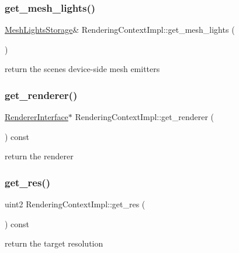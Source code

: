 \subsubsection{\texorpdfstring{get\+\_\+mesh\+\_\+lights()}{get\_mesh\_lights()}}
{\footnotesize\ttfamily \hyperlink{struct_mesh_lights_storage}{Mesh\+Lights\+Storage}\& Rendering\+Context\+Impl\+::get\+\_\+mesh\+\_\+lights (\begin{DoxyParamCaption}{ }\end{DoxyParamCaption})\hspace{0.3cm}{\ttfamily [inline]}}

return the scene\textquotesingle{}s device-\/side mesh emitters \mbox{\label{struct_rendering_context_impl_ab124c479feb26e431288df7fc20804a2}} 
\subsubsection{\texorpdfstring{get\+\_\+renderer()}{get\_renderer()}}
{\footnotesize\ttfamily \hyperlink{struct_renderer_interface}{Renderer\+Interface}$\ast$ Rendering\+Context\+Impl\+::get\+\_\+renderer (\begin{DoxyParamCaption}{ }\end{DoxyParamCaption}) const\hspace{0.3cm}{\ttfamily [inline]}}

return the renderer \mbox{\label{struct_rendering_context_impl_a691288ce177e1411abfcc6589d47e788}} 
\subsubsection{\texorpdfstring{get\+\_\+res()}{get\_res()}}
{\footnotesize\ttfamily uint2 Rendering\+Context\+Impl\+::get\+\_\+res (\begin{DoxyParamCaption}{ }\end{DoxyParamCaption}) const\hspace{0.3cm}{\ttfamily [inline]}}

return the target resolution \mbox{\label{struct_rendering_context_impl_a4bed878e13b19b2193983682499a6dc2}} 
